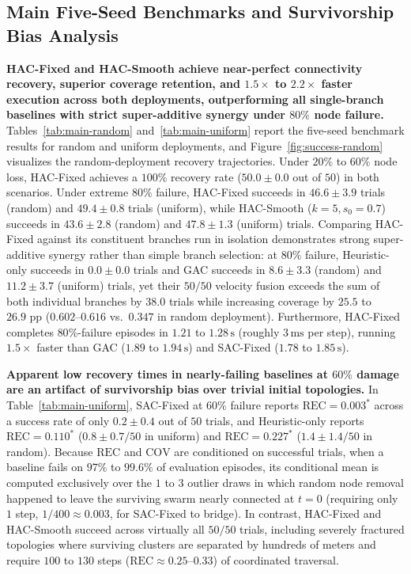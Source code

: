 \documentclass[11pt]{article}
\theoremstyle{plain}
\theoremstyle{definition}
\theoremstyle{remark}
\begin{document}
\subsection{Main Five-Seed Benchmarks and Survivorship Bias Analysis}
\label{sec:branch-ablation}
\textbf{HAC-Fixed and HAC-Smooth achieve near-perfect connectivity recovery, superior coverage retention, and $1.5\times$ to $2.2\times$ faster execution across both deployments, outperforming all single-branch baselines with strict super-additive synergy under $80\%$ node failure.} Tables~\ref{tab:main-random} and~\ref{tab:main-uniform} report the five-seed benchmark results for random and uniform deployments, and Figure~\ref{fig:success-random} visualizes the random-deployment recovery trajectories. Under $20\%$ to $60\%$ node loss, HAC-Fixed achieves a $100\%$ recovery rate ($50.0 \pm 0.0$ out of $50$) in both scenarios. Under extreme $80\%$ failure, HAC-Fixed succeeds in $46.6 \pm 3.9$ trials (random) and $49.4 \pm 0.8$ trials (uniform), while HAC-Smooth ($k=5, s_0=0.7$) succeeds in $43.6 \pm 2.8$ (random) and $47.8 \pm 1.3$ (uniform) trials. Comparing HAC-Fixed against its constituent branches run in isolation demonstrates strong super-additive synergy rather than simple branch selection: at $80\%$ failure, Heuristic-only succeeds in $0.0 \pm 0.0$ trials and GAC succeeds in $8.6 \pm 3.3$ (random) and $11.2 \pm 3.7$ (uniform) trials, yet their $50/50$ velocity fusion exceeds the sum of both individual branches by $38.0$ trials while increasing coverage by $25.5$ to $26.9\text{ pp}$ ($0.602$--$0.616$ vs.\ $0.347$ in random deployment). Furthermore, HAC-Fixed completes $80\%$-failure episodes in $1.21$ to $1.28\,\mathrm{s}$ (roughly $3\,\mathrm{ms}$ per step), running $1.5\times$ faster than GAC ($1.89$ to $1.94\,\mathrm{s}$) and SAC-Fixed ($1.78$ to $1.85\,\mathrm{s}$).

\textbf{Apparent low recovery times in nearly-failing baselines at $60\%$ damage are an artifact of survivorship bias over trivial initial topologies.} In Table~\ref{tab:main-uniform}, SAC-Fixed at $60\%$ failure reports $\mathrm{REC} = 0.003^*$ across a success rate of only $0.2 \pm 0.4$ out of $50$ trials, and Heuristic-only reports $\mathrm{REC} = 0.110^*$ ($0.8 \pm 0.7 / 50$ in uniform) and $\mathrm{REC} = 0.227^*$ ($1.4 \pm 1.4 / 50$ in random). Because $\mathrm{REC}$ and $\mathrm{COV}$ are conditioned on successful trials, when a baseline fails on $97\%$ to $99.6\%$ of evaluation episodes, its conditional mean is computed exclusively over the $1$ to $3$ outlier draws in which random node removal happened to leave the surviving swarm nearly connected at $t=0$ (requiring only $1$ step, $1/400 \approx 0.003$, for SAC-Fixed to bridge). In contrast, HAC-Fixed and HAC-Smooth succeed across virtually all $50/50$ trials, including severely fractured topologies where surviving clusters are separated by hundreds of meters and require $100$ to $130$ steps ($\mathrm{REC} \approx 0.25$--$0.33$) of coordinated traversal.
\end{document}
